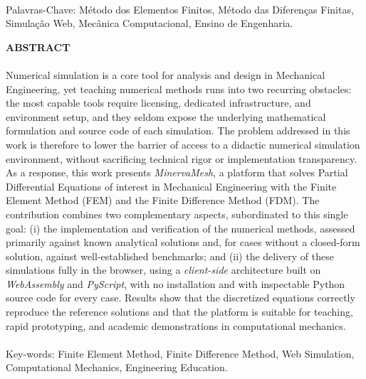 \paragraph{}
\noindent Palavras-Chave: Método dos Elementos Finitos, Método das Diferenças Finitas, Simulação Web, Mecânica Computacional, Ensino de Engenharia.

\pagebreak


\begin{center}
\textbf{ABSTRACT}
\end{center}
      \vspace{0.5cm}

\paragraph{}Numerical simulation is a core tool for analysis and design in Mechanical Engineering, yet teaching numerical methods runs into two recurring obstacles: the most capable tools require licensing, dedicated infrastructure, and environment setup, and they seldom expose the underlying mathematical formulation and source code of each simulation. The problem addressed in this work is therefore to lower the barrier of access to a didactic numerical simulation environment, without sacrificing technical rigor or implementation transparency. As a response, this work presents \textit{MinervaMesh}, a platform that solves Partial Differential Equations of interest in Mechanical Engineering with the Finite Element Method (FEM) and the Finite Difference Method (FDM). The contribution combines two complementary aspects, subordinated to this single goal: (i) the implementation and verification of the numerical methods, assessed primarily against known analytical solutions and, for cases without a closed-form solution, against well-established benchmarks; and (ii) the delivery of these simulations fully in the browser, using a \textit{client-side} architecture built on \textit{WebAssembly} and \textit{PyScript}, with no installation and with inspectable Python source code for every case. Results show that the discretized equations correctly reproduce the reference solutions and that the platform is suitable for teaching, rapid prototyping, and academic demonstrations in computational mechanics.
\paragraph{}
\noindent Key-words: Finite Element Method, Finite Difference Method, Web Simulation, Computational Mechanics, Engineering Education.

